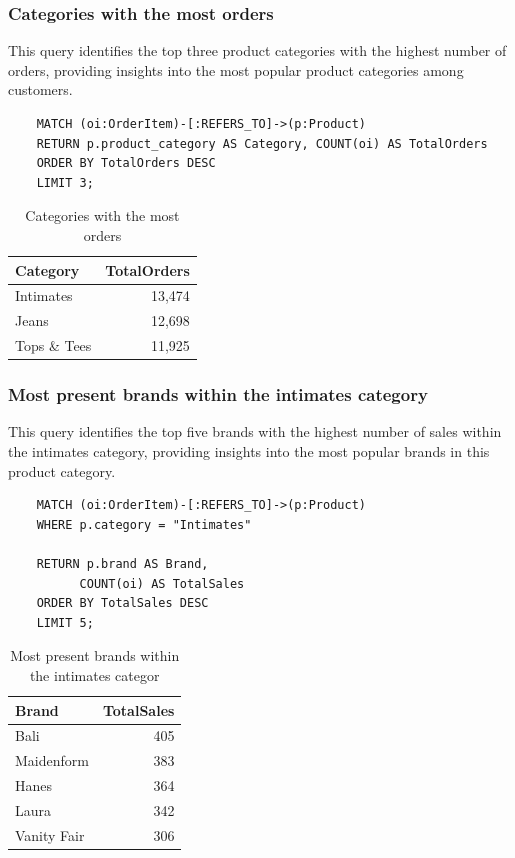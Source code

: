 \documentclass[a4paper,12pt]{article}
\begin{document}
  \subsubsection{Categories with the most orders}
  This query identifies the top three product categories with the highest number of orders, providing insights into the most popular product categories among customers.
  \begin{verbatim}  
    MATCH (oi:OrderItem)-[:REFERS_TO]->(p:Product)
    RETURN p.product_category AS Category, COUNT(oi) AS TotalOrders
    ORDER BY TotalOrders DESC
    LIMIT 3;
  \end{verbatim}
  \begin{table}[h!]
    \centering
    \caption{Categories with the most orders}
    \label{tab:total_orders_category}
    \begin{tabular}{l r}
        \toprule
        \textbf{Category} & \textbf{TotalOrders} \\
        \midrule
        Intimates     & 13,474 \\
        Jeans         & 12,698 \\
        Tops \& Tees  & 11,925 \\
        \bottomrule
    \end{tabular}
\end{table}

   \subsubsection{Most present brands within the intimates category}
    This query identifies the top five brands with the highest number of sales within the intimates category, providing insights into the most popular brands in this product category.
   \begin{verbatim}
    MATCH (oi:OrderItem)-[:REFERS_TO]->(p:Product)
    WHERE p.category = "Intimates"

    RETURN p.brand AS Brand, 
          COUNT(oi) AS TotalSales
    ORDER BY TotalSales DESC
    LIMIT 5;
    \end{verbatim}

    \begin{table}[h!]
      \centering
      \caption{Most present brands within the intimates categor}
      \label{tab:total_sales}
      \begin{tabular}{l r}
          \toprule
          \textbf{Brand}     & \textbf{TotalSales} \\
          \midrule
          Bali           & 405 \\
          Maidenform    & 383 \\
          Hanes         & 364 \\
          Laura         & 342 \\
          Vanity Fair   & 306 \\
          \bottomrule
      \end{tabular}
  \end{table}
\end{document}

